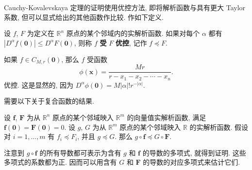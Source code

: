 Cauchy-Kovalevskaya 定理的证明使用优控方法, 即将解析函数与具有更大 Taylor 系数, 但可以显式给出的其他函数作比较. 作如下定义.

\begin{Definition}
\label{def:analytic-majorization}
设 $f$, $F$ 为定义在 $\mathbb{R}^n$ 原点的某个邻域内的实解析函数. 如果对每个 $\alpha$ 都有 $|D^\alpha f(\bm{0})|\leq D^\alpha F(\bm{0})$, 则称 $f$ \textbf{受} $F$ \textbf{优控}, 记作 $f\preceq F$.
\end{Definition}

\begin{Example}
\label{ex:rational-analytic-majorant}
如果 $f\in C_{M,r}(\bm{0})$, 那么 $f$ 受函数
\begin{equation}\label{eq:analytic-rational-majorant}
\phi(\bm{x})=\dfrac{Mr}{r-x_1-x_2-\cdots-x_n}.
\end{equation}
优控. 这是显然的, 因为 $D^\alpha\phi(\bm{0})=M|\alpha|!r^{-|\alpha|}$.
\end{Example}

需要以下关于复合函数的结果.

\begin{Theorem}
\label{thm:majorization-under-composition}
设 $\bm{f}$, $\bm{F}$ 为从 $\mathbb{R}^n$ 原点的某个邻域映入 $\mathbb{R}^m$ 的向量值实解析函数, 满足 $\bm{f}(\bm{0})=\bm{F}(\bm{0})=0$. 设 $g$, $G$ 为从 $\mathbb{R}^m$ 原点的某个邻域映入 $\mathbb{R}$ 的实解析函数. 假设对 $i=1,\ldots,m$ 有 $f_i\preceq F_i$, 并且 $g\preceq G$. 那么 $g\circ\bm{f}\preceq G\circ\bm{F}$.
\end{Theorem}

注意到 $g\circ\bm{f}$ 的所有导数都可表示为含有 $g$ 和 $\bm{f}$ 的导数的多项式, 就得到证明. 这些多项式的系数都为正. 因而可以用含有 $G$ 和 $\bm{F}$ 的导数的对应多项式来估计它们.
